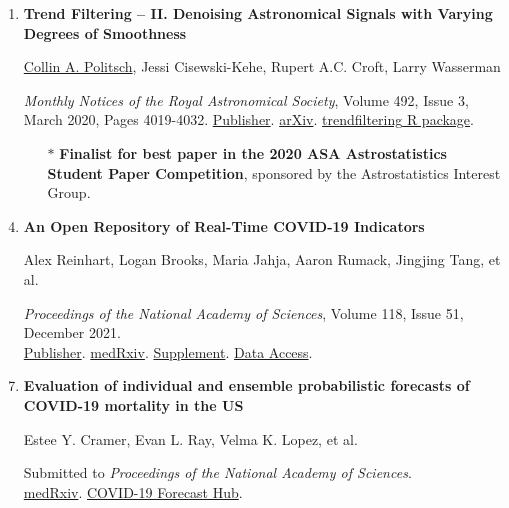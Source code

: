 \documentclass[letterpaper,10pt]{article}
\begin{document}
\begin{enumerate}
\item \textbf{Trend Filtering -- II. Denoising Astronomical Signals with Varying Degrees of Smoothness}
\vspace{-0.25cm}
\item[] \underline{Collin A. Politsch}, Jessi Cisewski-Kehe, Rupert A.C. Croft, Larry Wasserman
\vspace{-0.25cm}
\item[] {{\it Monthly Notices of the Royal Astronomical Society}}, Volume 492, Issue 3, March 2020, Pages 4019-4032. \href{https://doi.org/10.1093/mnras/staa110}{Publisher}. \href{https://arxiv.org/abs/2001.03552}{arXiv}. \href{https://capolitsch.github.io/trendfiltering}{\textsf{trendfiltering} R package}.
\vspace{-0.05cm}
\begin{itemize}
\item[$\boldsymbol{\ast}$]{\bf Finalist for best paper in the 2020 ASA Astrostatistics Student Paper Competition}, sponsored by the Astrostatistics Interest Group.
\end{itemize}

\vspace{0.1cm}

\item \textbf{An Open Repository of Real-Time COVID-19 Indicators} 
\vspace{-0.25cm}
\item[] Alex Reinhart, Logan Brooks, Maria Jahja, Aaron Rumack, Jingjing Tang, et al.
\vspace{-0.25cm}
\item[] \emph{Proceedings of the National Academy of Sciences}, Volume 118, Issue 51, December 2021. \\\href{https://doi.org/10.1073/pnas.2111452118}{Publisher}. \href{https://www.medrxiv.org/content/10.1101/2021.07.12.21259660v1}{medRxiv}. \href{https://www.pnas.org/content/pnas/suppl/2021/12/10/2111452118.DCSupplemental/pnas.2111452118.sapp.pdf}{Supplement}. \href{https://cmu-delphi.github.io/delphi-epidata/api/covidcast.html}{Data Access}.

\vspace{0.15cm}

\item \textbf{Evaluation of individual and ensemble probabilistic forecasts of COVID-19 mortality in the US} 
\vspace{-0.25cm}
\item[] Estee Y. Cramer, Evan L. Ray, Velma K. Lopez, et al.
\vspace{-0.25cm}
\item[] Submitted to \emph{Proceedings of the National Academy of Sciences}.\\ 
\href{https://www.medrxiv.org/content/10.1101/2021.02.03.21250974v3}{medRxiv}. \href{https://covid19forecasthub.org/}{COVID-19 Forecast Hub}.


\end{enumerate}
\end{document}
